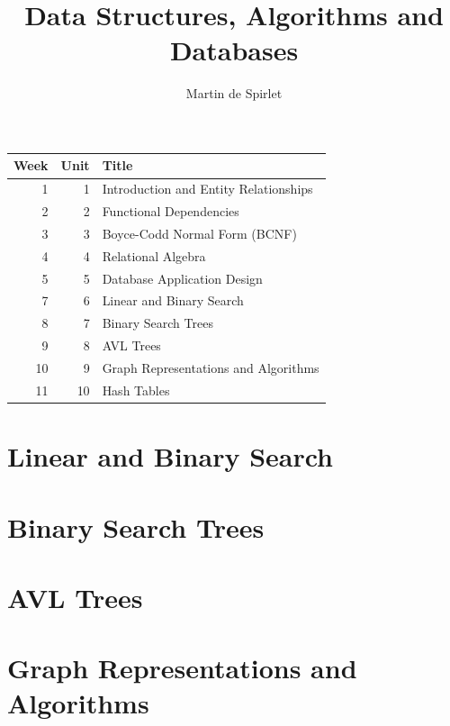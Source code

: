 \documentclass[
  11pt,
  a4paper,
]{article}
\title{Data Structures, Algorithms and Databases}
\author{Martin de Spirlet}
\date{}
\begin{document}

\maketitle

\vspace*{\fill}

\begin{table}[htp]
  \centering
  \begin{tabular}{rrl}
    \toprule
    Week & Unit & Title \\
    \midrule
     1 &  1 & Introduction and Entity Relationships \\
     2 &  2 & Functional Dependencies \\
     3 &  3 & Boyce-Codd Normal Form (BCNF) \\
     4 &  4 & Relational Algebra \\
     5 &  5 & Database Application Design \\
     7 &  6 & Linear and Binary Search \\
     8 &  7 & Binary Search Trees \\
     9 &  8 & AVL Trees \\
    10 &  9 & Graph Representations and Algorithms \\
    11 & 10 & Hash Tables \\
    \bottomrule
  \end{tabular}
\end{table}

\vspace*{\fill}
\addvspace{1in}

\clearpage


\section{Linear and Binary Search}


\section{Binary Search Trees}


\section{AVL Trees}


\section{Graph Representations and Algorithms}

\end{document}
